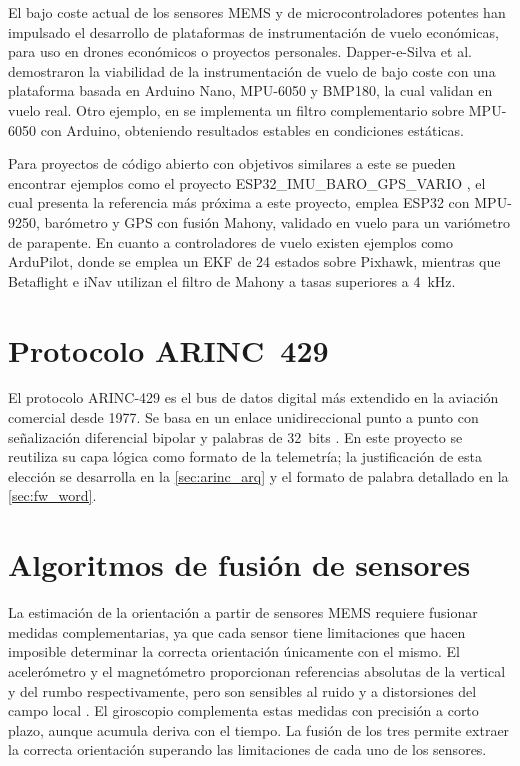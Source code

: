 El bajo coste actual de los sensores MEMS y de microcontroladores potentes han impulsado el desarrollo de plataformas de instrumentación de vuelo económicas, para uso en drones económicos o proyectos personales. Dapper-e-Silva et al.
\cite{dapper2018} demostraron la viabilidad de la instrumentación de vuelo de bajo coste con una plataforma basada en Arduino Nano, MPU-6050 y BMP180, la cual validan en vuelo real. Otro ejemplo, en \cite{das2025} se implementa un filtro complementario sobre MPU-6050 con Arduino, obteniendo resultados estables en condiciones estáticas.

Para proyectos de código abierto con objetivos similares a este se pueden encontrar ejemplos como el proyecto ESP32\_IMU\_BARO\_GPS\_VARIO \cite{harinair_vario}, el cual presenta la referencia más próxima a este proyecto, emplea ESP32
con MPU-9250, barómetro y GPS con fusión Mahony, validado en vuelo para un variómetro de parapente. En cuanto a controladores de vuelo existen ejemplos como ArduPilot, donde se emplea un EKF de 24 estados sobre Pixhawk, mientras que Betaflight e iNav utilizan el filtro de Mahony a tasas superiores a \SI{4}{\kilo\hertz}.


\section{Protocolo ARINC~429}
\label{sec:ea_arinc}

El protocolo ARINC-429 \cite{arinc429} es el bus de datos digital más extendido en la aviación comercial desde 1977. Se basa en un enlace unidireccional punto a punto con señalización diferencial bipolar y palabras de 32~bits \cite{aim_arinc429}. En este proyecto se reutiliza su capa lógica como formato de la telemetría; la justificación de esta elección se desarrolla en la \cref{sec:arinc_arq} y el formato de palabra detallado en la \cref{sec:fw_word}.


\section{Algoritmos de fusión de sensores}
\label{sec:ea_fusion}

La estimación de la orientación a partir de sensores MEMS requiere fusionar medidas complementarias, ya que cada sensor tiene limitaciones que hacen imposible determinar la correcta orientación únicamente con el mismo. El acelerómetro y el magnetómetro proporcionan referencias absolutas de la vertical y del rumbo respectivamente, pero son sensibles al ruido y a distorsiones del campo local \cite{woodman2007}. El giroscopio complementa estas medidas con precisión a corto plazo, aunque acumula deriva con el tiempo. La fusión de los tres permite extraer la correcta orientación superando las limitaciones de cada uno de los sensores.

